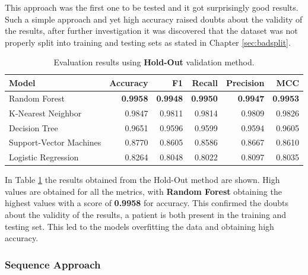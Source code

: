                 This approach was the first one to be tested and it got surprisingly good results. Such a simple approach and yet high accuracy raised doubts about the validity of the results, after further investigation it was discovered that the dataset was not properly split into training and testing sets as stated in Chapter \ref{sec:badsplit}. 
            
                \begin{table}[htbp]
                    \centering
                    \caption{Evaluation results using \textbf{Hold-Out} validation method.}
                    \label{tab:wrong_approach_holdout}
                    \begin{tabular}{lrrrrr}
                        \toprule
                        \textbf{Model} & \textbf{Accuracy} & \textbf{F1} & \textbf{Recall} & \textbf{Precision} & \textbf{MCC} \\
                        \midrule
                        Random Forest & \textbf{0.9958} & \textbf{0.9948} & \textbf{0.9950} & \textbf{0.9947} & \textbf{0.9953} \\
                        K-Nearest Neighbor & 0.9847 & 0.9811 & 0.9814 & 0.9809 & 0.9826 \\
                        Decision Tree & 0.9651 & 0.9596 & 0.9599 & 0.9594 & 0.9605 \\
                        Support-Vector Machines & 0.8770 & 0.8605 & 0.8586 & 0.8667 & 0.8610 \\
                        Logistic Regression & 0.8264 & 0.8048 & 0.8022 & 0.8097 & 0.8035 \\
                        \bottomrule
                    \end{tabular}
                \end{table}

                In Table \ref{tab:wrong_approach_holdout} the results obtained from the Hold-Out method are shown. High values are obtained for all the metrics, with \textbf{Random Forest} obtaining the highest values with a score of \textbf{0.9958} for accuracy. This confirmed the doubts about the validity of the results, a patient is both present in the training and testing set. This led to the models overfitting the data and obtaining high accuracy.

            \subsubsection{Sequence Approach}

